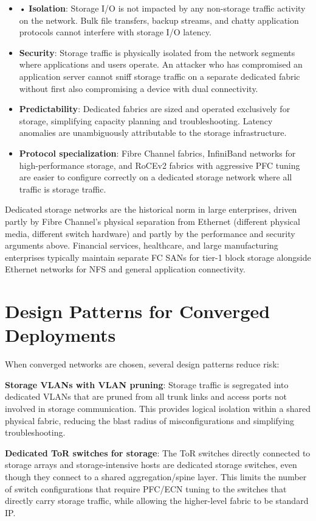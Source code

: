 \begin{itemize}
  \item • \textbf{Isolation}: Storage I/O is not impacted by any non-storage traffic activity on the network. Bulk file transfers, backup streams, and chatty application protocols cannot interfere with storage I/O latency.
  \item \textbf{Security}: Storage traffic is physically isolated from the network segments where applications and users operate. An attacker who has compromised an application server cannot sniff storage traffic on a separate dedicated fabric without first also compromising a device with dual connectivity.
  \item \textbf{Predictability}: Dedicated fabrics are sized and operated exclusively for storage, simplifying capacity planning and troubleshooting. Latency anomalies are unambiguously attributable to the storage infrastructure.
  \item \textbf{Protocol specialization}: Fibre Channel fabrics, InfiniBand networks for high-performance storage, and RoCEv2 fabrics with aggressive PFC tuning are easier to configure correctly on a dedicated storage network where all traffic is storage traffic.
\end{itemize}

Dedicated storage networks are the historical norm in large enterprises, driven partly by Fibre Channel's physical separation from Ethernet (different physical media, different switch hardware) and partly by the performance and security arguments above. Financial services, healthcare, and large manufacturing enterprises typically maintain separate FC SANs for tier-1 block storage alongside Ethernet networks for NFS and general application connectivity.

\section{Design Patterns for Converged Deployments}
When converged networks are chosen, several design patterns reduce risk:

\textbf{Storage VLANs with VLAN pruning}: Storage traffic is segregated into dedicated VLANs that are pruned from all trunk links and access ports not involved in storage communication. This provides logical isolation within a shared physical fabric, reducing the blast radius of misconfigurations and simplifying troubleshooting.

\textbf{Dedicated ToR switches for storage}: The ToR switches directly connected to storage arrays and storage-intensive hosts are dedicated storage switches, even though they connect to a shared aggregation/spine layer. This limits the number of switch configurations that require PFC/ECN tuning to the switches that directly carry storage traffic, while allowing the higher-level fabric to be standard IP.

